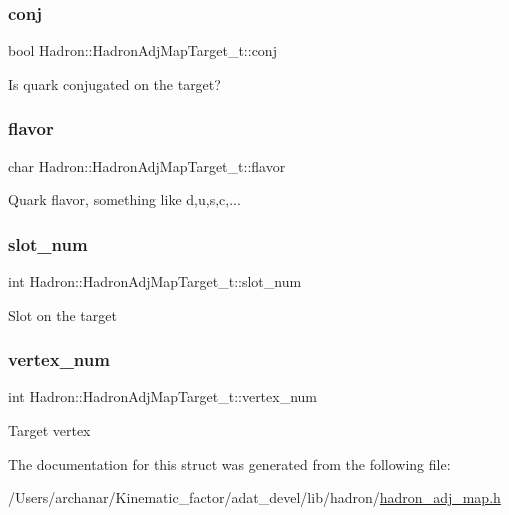\subsubsection{\texorpdfstring{conj}{conj}}
{\footnotesize\ttfamily bool Hadron\+::\+Hadron\+Adj\+Map\+Target\+\_\+t\+::conj}

Is quark conjugated on the target? \mbox{\label{structHadron_1_1HadronAdjMapTarget__t_a649624915499cdf922a11d0df23e1aa0}} 
\subsubsection{\texorpdfstring{flavor}{flavor}}
{\footnotesize\ttfamily char Hadron\+::\+Hadron\+Adj\+Map\+Target\+\_\+t\+::flavor}

Quark flavor, something like d,u,s,c,... \mbox{\label{structHadron_1_1HadronAdjMapTarget__t_a59cc83d2da52e974a06d4ae8dc8b1468}} 
\subsubsection{\texorpdfstring{slot\_num}{slot\_num}}
{\footnotesize\ttfamily int Hadron\+::\+Hadron\+Adj\+Map\+Target\+\_\+t\+::slot\+\_\+num}

Slot on the target \mbox{\label{structHadron_1_1HadronAdjMapTarget__t_a591e79f978fc68efa83b729d13e6872c}} 
\subsubsection{\texorpdfstring{vertex\_num}{vertex\_num}}
{\footnotesize\ttfamily int Hadron\+::\+Hadron\+Adj\+Map\+Target\+\_\+t\+::vertex\+\_\+num}

Target vertex 

The documentation for this struct was generated from the following file\+:\begin{DoxyCompactItemize}
\item 
/\+Users/archanar/\+Kinematic\+\_\+factor/adat\+\_\+devel/lib/hadron/\mbox{\hyperlink{lib_2hadron_2hadron__adj__map_8h}{hadron\+\_\+adj\+\_\+map.\+h}}\end{DoxyCompactItemize}
